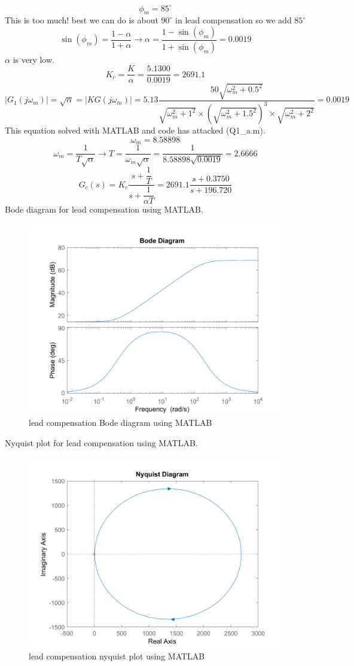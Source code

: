 $$
\phi_m = 85^{\circ}
$$
This is too much!
best we can do is about $90^{\circ}$ in lead compensation so we add $85^{\circ}$
$$
\sin(\phi_m) = \dfrac{1-\alpha}{1+\alpha} \to
\alpha = \dfrac{1-\sin(\phi_m) }{1+\sin(\phi_m) } = 0.0019
$$
$\alpha$ is very low.
$$
K_c = \dfrac{K}{\alpha} = \dfrac{5.1300}{0.0019} = 2691.1
$$
$$
\left\vert G_1(j\omega_m) \right\vert = \sqrt{\alpha} = \left\vert KG(j\omega_m) \right\vert = 5.13 \dfrac{50\sqrt{\omega_m^2+0.5^2}}{\sqrt{\omega_m^2+1^2}\times(\sqrt{\omega_m^2 + 1.5^2})^3\times\sqrt{\omega_m^2 + 2^2}} = 0.0019
$$
This equation solved with MATLAB and code has attacked (Q1\_a.m).
$$
\omega_m = 8.58898
$$
$$
\omega_m = \dfrac{1}{T\sqrt{\alpha}} \to
T = \dfrac{1}{\omega_m\sqrt{\alpha}} = \dfrac{1}{8.58898\sqrt{0.0019}} = 2.6666
$$
$$
G_c(s) = K_c \dfrac{s + \dfrac{1}{T}}{s + \dfrac{1}{\alpha T}} = 2691.1\dfrac{s + 0.3750}{s + 196.720}
$$
Bode diagram for lead compensation using MATLAB.
\begin{figure}[H]
	\caption{lead compensation Bode diagram using MATLAB}
	\centering
	\includegraphics[width=12cm]{../Figure/Q1/a/controller_bode.png}
\end{figure}
Nyquist plot for lead compensation using MATLAB.
\begin{figure}[H]
	\caption{lead compensation nyquist plot using MATLAB}
	\centering
	\includegraphics[width=12cm]{../Figure/Q1/a/controller_nyquist.png}
\end{figure}
